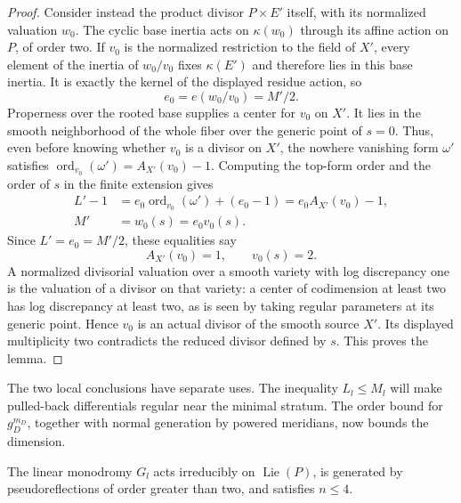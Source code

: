 \begin{proof}
Consider instead the product divisor \(P\times E'\) itself, with its
normalized valuation \(w_0\).
The cyclic base inertia acts on \(\kappa(w_0)\) through its affine
action on \(P\), of order two.  If \(v_0\) is the normalized restriction
to the field of \(X'\), every element of the inertia of \(w_0/v_0\)
fixes \(\kappa(E')\) and therefore lies in this base inertia.
It is exactly the kernel of the displayed residue action, so
\[
                         e_0=e(w_0/v_0)=M'/2.
\]
Properness over the rooted base supplies a center for \(v_0\) on
\(X'\).  It lies in the smooth neighborhood of the whole fiber over
the generic point of \(s=0\).  Thus, even before knowing whether
\(v_0\) is a divisor on \(X'\), the nowhere vanishing form
\(\omega'\) satisfies
\(\operatorname{ord}_{v_0}(\omega')=A_{X'}(v_0)-1\).
Computing the top-form order and the order of \(s\) in the finite
extension gives
\[
 \begin{aligned}
 L'-1
   &=e_0\operatorname{ord}_{v_0}(\omega')+(e_0-1)
     =e_0A_{X'}(v_0)-1,\\
 M'&=w_0(s)=e_0v_0(s).
 \end{aligned}
\]
Since \(L'=e_0=M'/2\), these equalities say
\[
                  A_{X'}(v_0)=1,\qquad v_0(s)=2.
\]
A normalized divisorial valuation over a smooth variety
with log discrepancy one is the valuation of a divisor on that
variety: a center of codimension at least two has log discrepancy
at least two, as is seen by taking regular parameters at its
generic point.  Hence \(v_0\) is an actual divisor of the smooth
source \(X'\).
Its displayed multiplicity two contradicts the reduced divisor
defined by \(s\).  This proves the lemma.
\end{proof}

The two local conclusions have separate uses.  The inequality
\(L_l\le M_l\) will make pulled-back differentials regular near the
minimal stratum.  The order bound for \(g_D^{m_D}\), together with
normal generation by powered meridians, now bounds the dimension.

\begin{lemma}\label{iso:dimension-bound}
The linear monodromy \(G_l\) acts irreducibly on
\(\operatorname{Lie}(P)\), is generated by pseudoreflections of order
greater than two, and satisfies \(n\le4\).
\end{lemma}

